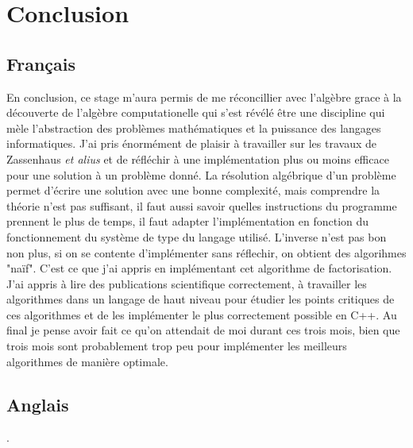 \chapter{Conclusion}
\section{Français}
En conclusion, ce stage m'aura permis de me réconcillier avec l'algèbre grace à la découverte de l'algèbre computationelle qui s'est
révélé être une discipline qui mèle l'abstraction des problèmes mathématiques et la puissance des langages informatiques. J'ai pris énormément de
plaisir à travailler sur les travaux de Zassenhaus \textit{et alius} et de réfléchir à une implémentation plus ou moins efficace pour une
solution à un problème donné. La résolution algébrique d'un problème permet d'écrire une solution avec une bonne complexité,
mais comprendre la théorie n'est pas suffisant, il faut aussi savoir quelles instructions du programme prennent le plus de temps, il
faut adapter l'implémentation en fonction du fonctionnement du système de type du langage utilisé. L'inverse n'est pas bon non plus, 
si on se contente d'implémenter sans réflechir, on obtient des algorihmes "naïf". C'est ce que j'ai appris en implémentant cet algorithme
de factorisation. J'ai appris à lire des publications scientifique correctement, à travailler les algorithmes dans un langage de haut niveau
pour étudier les points critiques de ces algorithmes et de les implémenter le plus correctement possible en C++. Au final je pense avoir
fait ce qu'on attendait de moi durant ces trois mois, bien que trois mois sont probablement trop peu pour implémenter les meilleurs
algorithmes de manière optimale.


\section{Anglais}

.
